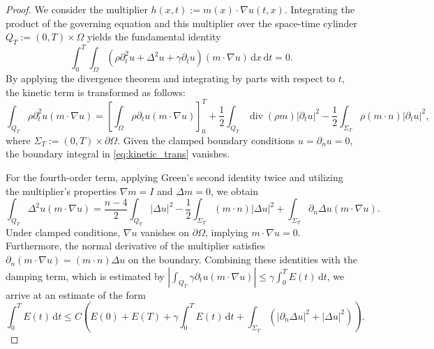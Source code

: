 \documentclass[12pt,reqno]{amsart}
\numberwithin{equation}{section}
\begin{document}
	\begin{proof}
		We consider the multiplier $h(x,t) := m(x) \cdot \nabla u(t,x)$. Integrating the product of the governing equation and this multiplier over the space-time cylinder $Q_T := (0,T) \times \Omega$ yields the fundamental identity
		\begin{equation*}\label{eq:multiplier_integral}
			\int_0^T \int_\Omega \left( \rho\partial_t^2 u + \Delta^2 u + \gamma\partial_t u \right) (m \cdot \nabla u) \, \mathrm{d}x \, \mathrm{d}t = 0.
		\end{equation*}
		By applying the divergence theorem and integrating by parts with respect to $t$, the kinetic term is transformed as follows:
		\begin{equation}\label{eq:kinetic_trans}
			\int_{Q_T} \rho\partial_t^2 u (m \cdot \nabla u) = \left[ \int_\Omega \rho\partial_t u (m \cdot \nabla u) \right]_0^T + \frac{1}{2} \int_{Q_T} \operatorname{div}(\rho m) |\partial_t u|^2 - \frac{1}{2} \int_{\Sigma_T} \rho (m \cdot n) |\partial_t u|^2,
		\end{equation}
		where $\Sigma_T := (0,T) \times \partial\Omega$. Given the clamped boundary conditions $u = \partial_n u = 0$, the boundary integral in \eqref{eq:kinetic_trans} vanishes. 
		
		For the fourth-order term, applying Green's second identity twice and utilizing the multiplier's properties $\nabla m = I$ and $\Delta m = 0$, we obtain
		\begin{equation}\label{eq:biharmonic_trans}
			\int_{Q_T} \Delta^2 u (m \cdot \nabla u) = \frac{n-4}{2} \int_{Q_T} |\Delta u|^2 - \frac{1}{2} \int_{\Sigma_T} (m \cdot n) |\Delta u|^2 + \int_{\Sigma_T} \partial_n \Delta u (m \cdot \nabla u).
		\end{equation}
		Under clamped conditions, $\nabla u$ vanishes on $\partial\Omega$, implying $m \cdot \nabla u = 0$. Furthermore, the normal derivative of the multiplier satisfies $\partial_n(m \cdot \nabla u) = (m \cdot n) \Delta u$ on the boundary. Combining these identities with the damping term, which is estimated by $| \int_{Q_T} \gamma \partial_t u (m \cdot \nabla u) | \le \gamma \int_0^T E(t) \, \mathrm{d}t$, we arrive at an estimate of the form
		\begin{equation}\label{eq:combined_identity}
			\int_0^T E(t) \, \mathrm{d}t \le C \left( E(0) + E(T) + \gamma \int_0^T E(t) \, \mathrm{d}t + \int_{\Sigma_T} ( |\partial_n \Delta u|^2 + |\Delta u|^2 ) \right).
		\end{equation}
		

\end{proof}
\end{document}
